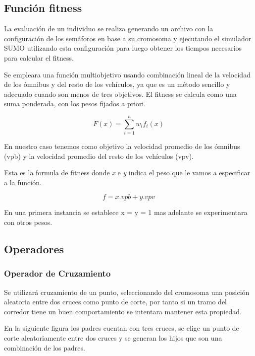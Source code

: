 \subsection{Función fitness}
La evaluación de un individuo se realiza generando un archivo con la configuración de los semáforos en base a su cromosoma y ejecutando el simulador SUMO utilizando esta configuración para luego obtener los tiempos necesarios para calcular el fitness.

Se empleara una función multiobjetivo usando combinación lineal de la velocidad de los ómnibus y del resto de los vehículos, ya que es un método sencillo y adecuado cuando son menos de tres objetivos. El fitness se calcula como una suma ponderada, con los pesos fijados a priori.

        \begin{equation}
        \label{eq:funcion_fitness_generica}
		F(x) = \sum_{i=1}^{n}{w_i}{f_i}(x)
        \end{equation}

En nuestro caso tenemos como objetivo la velocidad promedio de los ómnibus (vpb) y la velocidad promedio del resto de los vehículos (vpv).

Esta es la formula de fitness donde \emph{x} e \emph{y} indica el peso que le vamos a especificar a la función. 

        \begin{equation}
        \label{eq:funcion_fitness}
        f = x.vpb + y.vpv
        \end{equation}
        
En una primera instancia se establece x = y = 1 mas adelante se experimentara con otros pesos.

\subsection{Operadores}
\subsubsection{Operador de Cruzamiento}
Se  utilizará cruzamiento de un punto, seleccionando del cromosoma una posición aleatoria entre dos cruces como punto de corte, por tanto si un tramo del corredor tiene un buen comportamiento se intentara mantener esta propiedad.

En la siguiente figura los padres cuentan con tres cruces, se elige un punto de corte aleatoriamente entre dos cruces y se generan los hijos que son una combinación de los padres.

